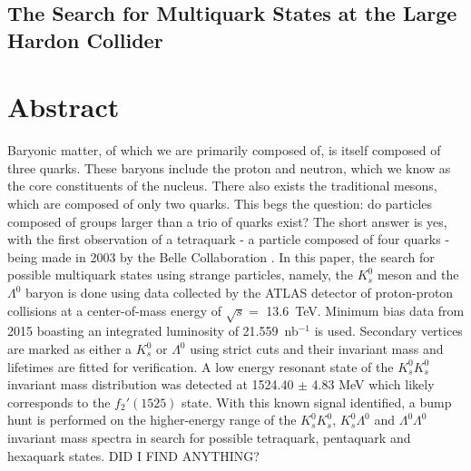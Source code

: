 \documentclass{article}
\date{October 12, 2023} %
\begin{document}
\large
\begin{center}
\section*{The Search for Multiquark States at the Large Hardon Collider}
\end{center}
\normalsize 




\section*{Abstract}
Baryonic matter, of which we are primarily composed of, is itself composed of three quarks.
These baryons include the proton and neutron, which we know as the core constituents of the 
nucleus. There also exists the traditional mesons, which are composed of only two quarks. This begs the question:
do particles composed of groups larger than a trio of quarks exist? The short answer is yes, 
with the first observation of a tetraquark - a particle composed of four quarks - being made 
in 2003 by the Belle Collaboration \cite{MultiquarkDiscovery}.
In this paper, the search for possible multiquark states using strange particles, namely, the 
$K^0_s$ meson and the $\Lambda^0$ baryon is done using data collected by the ATLAS detector 
of proton-proton collisions at a center-of-mass energy of $\sqrt{s} =$ \SI{13.6}{TeV}. Minimum
bias data from 2015 boasting an integrated luminosity of \SI{21.559}{nb}$^{-1}$ is used. Secondary 
vertices are marked as either a $K^0_s$ or $\Lambda^0$ using strict cuts and their invariant mass and 
lifetimes are fitted for verification. A low energy resonant state of the $K^0_sK^0_s$ invariant 
mass distribution was detected at 1524.40 $\pm$ 4.83 MeV which likely corresponds to the 
$f_2'(1525)$ state. With this known signal identified, a bump hunt is performed on the higher-energy
range of the $K^0_sK^0_s$, $K^0_s\Lambda^0$ and $\Lambda^0\Lambda^0$ invariant mass spectra
in search for possible tetraquark, pentaquark and hexaquark states. DID I FIND ANYTHING?
\end{document}
